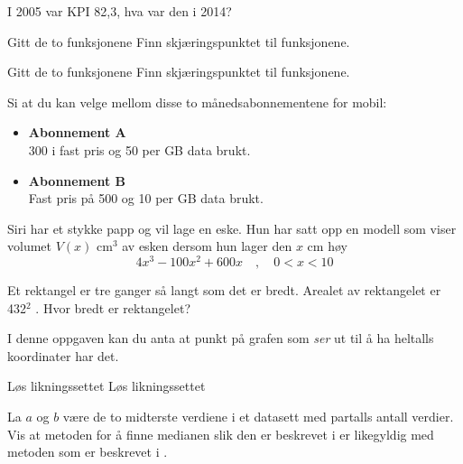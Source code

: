 I 2005 var KPI 82,3, hva var den i 2014?

\nes
{}
Gitt de to funksjonene
Finn skjæringspunktet til funksjonene.

Gitt de to funksjonene
Finn skjæringspunktet til funksjonene.

Si at du kan velge mellom disse to månedsabonnementene for mobil:
\begin{itemize}
	\item \textbf{Abonnement A} \\
	300 i fast pris og 50 per GB data brukt.
	\item \textbf{Abonnement B} \\
	Fast pris på 500 og 10 per GB data brukt.
\end{itemize}

Siri har et stykke papp og vil lage en eske. Hun har satt opp en modell som viser
volumet $ V(x) $ cm$ ^3 $ av esken dersom hun lager den $ x $ cm høy
\[ 4x^3-100x^2+600x\quad,\quad 0<x<10\]

Et rektangel er tre ganger så langt som det er bredt. Arealet av rektangelet er 432$ ^2 $ .\os
Hvor bredt er rektangelet?

\newpage
{}
I denne oppgaven kan du anta at punkt på grafen som \textit{ser} ut til å ha heltalls koordinater har det.


\nes
{}
Løs likningssettet
Løs likningssettet

La $ a $ og $ b $ være de to midterste verdiene i et datasett med partalls antall verdier. Vis at metoden for å finne medianen slik den er beskrevet i  er likegyldig med metoden som er beskrevet i .




